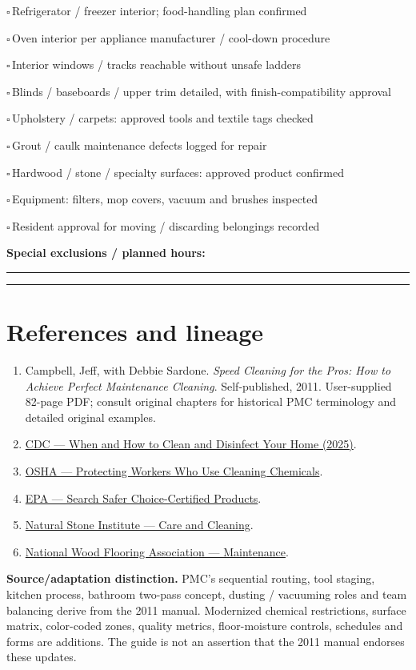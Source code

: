 \documentclass[10pt,letterpaper,oneside]{article}
\newcommand{\tick}{\ensuremath{\square}\,}
\newcommand{\task}[1]{\par\noindent\tick #1\par}
\newcommand{\refurl}[2]{\href{#2}{#1}}
\begin{document}
\begin{plainbox}
\task{Refrigerator / freezer interior; food-handling plan confirmed}
\task{Oven interior per appliance manufacturer / cool-down procedure}
\task{Interior windows / tracks reachable without unsafe ladders}
\task{Blinds / baseboards / upper trim detailed, with finish-compatibility approval}
\task{Upholstery / carpets: approved tools and textile tags checked}
\task{Grout / caulk maintenance defects logged for repair}
\task{Hardwood / stone / specialty surfaces: approved product confirmed}
\task{Equipment: filters, mop covers, vacuum and brushes inspected}
\task{Resident approval for moving / discarding belongings recorded}
\end{plainbox}
\textbf{Special exclusions / planned hours:}\par\rule{\linewidth}{.3pt}\vspace{18pt}\par\rule{\linewidth}{.3pt}
\section{References and lineage}
\begin{enumerate}
\item Campbell, Jeff, with Debbie Sardone. \emph{Speed Cleaning for the Pros: How to Achieve Perfect Maintenance Cleaning}. Self-published, 2011. User-supplied 82-page PDF; consult original chapters for historical PMC terminology and detailed original examples.
\item \refurl{CDC --- When and How to Clean and Disinfect Your Home (2025)}{https://www.cdc.gov/hygiene/about/when-and-how-to-clean-and-disinfect-your-home.html}.
\item \refurl{OSHA --- Protecting Workers Who Use Cleaning Chemicals}{https://www.osha.gov/sites/default/files/publications/OSHA3512.pdf}.
\item \refurl{EPA --- Search Safer Choice-Certified Products}{https://www.epa.gov/saferchoice/products}.
\item \refurl{Natural Stone Institute --- Care and Cleaning}{https://www.naturalstoneinstitute.org/consumers/care/}.
\item \refurl{National Wood Flooring Association --- Maintenance}{https://woodfloors.org/maintenance/}.
\end{enumerate}
\begin{notebox}\textbf{Source/adaptation distinction.} PMC's sequential routing, tool staging, kitchen process, bathroom two-pass concept, dusting / vacuuming roles and team balancing derive from the 2011 manual. Modernized chemical restrictions, surface matrix, color-coded zones, quality metrics, floor-moisture controls, schedules and forms are additions. The guide is not an assertion that the 2011 manual endorses these updates.\end{notebox}
\end{document}
